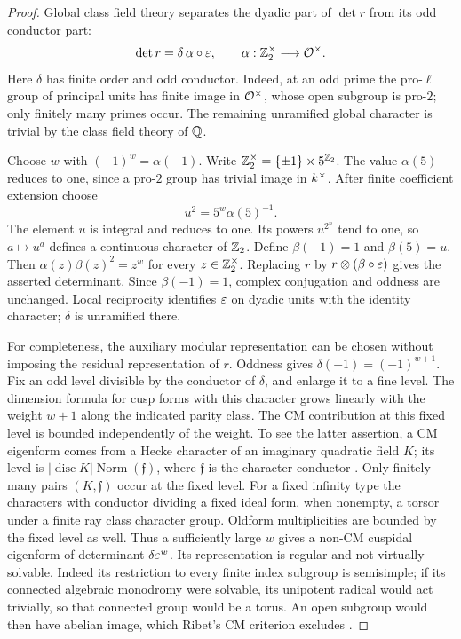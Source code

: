 \begin{proof}
Global class field theory separates the dyadic part of $\det r$ from
its odd conductor part:
\[
 \det r=\delta\,\alpha\circ\varepsilon,
 \qquad \alpha:\mathbb Z_2^\times\longrightarrow\mathcal O^\times.
\]
Here $\delta$ has finite order and odd conductor.  Indeed, at an odd
prime the pro-$\ell$ group of principal units has finite image in
$\mathcal O^\times$, whose open subgroup is pro-$2$; only finitely many
primes occur.  The remaining unramified global character is trivial
by the class field theory of $\mathbb Q$.

Choose $w$ with $(-1)^w=\alpha(-1)$.  Write
$\mathbb Z_2^\times=\{\pm1\}\times5^{\mathbb Z_2}$.  The value $\alpha(5)$
reduces to one, since a pro-$2$ group has trivial image in
$k^\times$.  After finite coefficient extension choose
\[
 u^2=5^w\alpha(5)^{-1}.
\]
The element $u$ is integral and reduces to one.  Its powers $u^{2^n}$
tend to one, so $a\mapsto u^a$ defines a continuous character of
$\mathbb Z_2$.  Define $\beta(-1)=1$ and $\beta(5)=u$.  Then
$\alpha(z)\beta(z)^2=z^w$ for every $z\in\mathbb Z_2^\times$.
Replacing $r$ by $r\otimes(\beta\circ\varepsilon)$ gives the asserted
determinant.  Since $\beta(-1)=1$, complex conjugation and oddness
are unchanged.  Local reciprocity identifies $\varepsilon$ on dyadic units
with the identity character; $\delta$ is unramified there.

For completeness, the auxiliary modular representation can be chosen
without imposing the residual representation of $r$.  Oddness gives
$\delta(-1)=(-1)^{w+1}$.  Fix an odd level divisible by the conductor
of $\delta$, and enlarge it to a fine level.  The dimension formula
\cite[Section~III, Th\'eor\`eme~1]{CohenOesterle1977}
for cusp forms with this character grows linearly with the weight
$w+1$ along the indicated parity class.  The CM contribution at this
fixed level is bounded independently of the weight.  To see the
latter assertion, a CM eigenform comes from a Hecke character of an
imaginary quadratic field $K$; its level is
$|\operatorname{disc}K|\operatorname{Norm}(\mathfrak f)$, where
$\mathfrak f$ is the character conductor
\cite[Theorem~(3.4), Corollary~(3.5), and Theorem~(4.5)]{Ribet1977}.
Only finitely many pairs
$(K,\mathfrak f)$ occur at the fixed level.  For a fixed infinity
type the characters with conductor dividing a fixed ideal form, when
nonempty, a torsor under a finite ray class character group.  Oldform
multiplicities are bounded by the fixed level as well.  Thus a
sufficiently large $w$ gives a non-CM cuspidal eigenform of determinant
$\delta\varepsilon^w$.  Its representation is regular and not virtually
solvable.  Indeed its restriction to every finite index subgroup is
semisimple; if its connected algebraic monodromy were solvable, its
unipotent radical would act trivially, so that connected group would
be a torus.  An open subgroup would then have abelian image, which
Ribet's CM criterion excludes
\cite[Propositions~(4.2) and~(4.4)]{Ribet1977}.
\end{proof}

